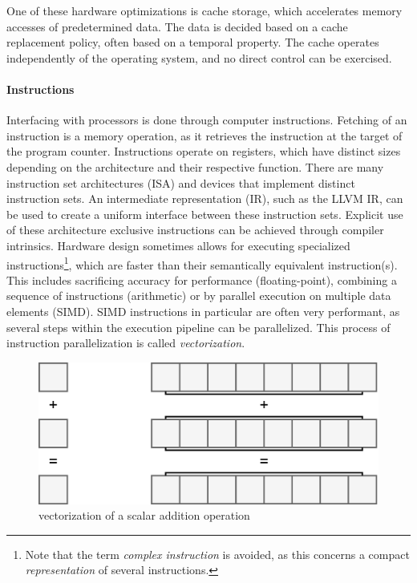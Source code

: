 \documentclass{article}
\begin{document}
One of these hardware optimizations is cache storage, which accelerates memory accesses of predetermined data.
The data is decided based on a cache replacement policy, often based on a temporal property. 
The cache operates independently of the operating system\cite{memory}, and no direct control can be exercised.

\paragraph{Instructions}

Interfacing with processors is done through computer instructions.
Fetching of an instruction is a memory operation, as it retrieves the instruction at the target of the program counter.
Instructions operate on registers, which have distinct sizes depending on the architecture and their respective function.
There are many instruction set architectures (ISA) and devices that implement distinct instruction sets.
An intermediate representation (IR), such as the LLVM IR\cite{LLVM}, can be used to create a uniform interface between these instruction sets\cite{intermediate-representation}.
Explicit use of these architecture exclusive instructions can be achieved through compiler intrinsics.
Hardware design sometimes allows for executing specialized instructions\footnote{Note that the term {\it complex instruction} is avoided, as this concerns a compact {\it representation} of several instructions. }, which are faster than their semantically equivalent instruction(s).
This includes sacrificing accuracy for performance (floating-point), combining a sequence of instructions (arithmetic) or by parallel execution on multiple data elements (SIMD).
SIMD instructions in particular are often very performant, as several steps within the execution pipeline can be parallelized.
This process of instruction parallelization is called {\it vectorization}.

\begin{figure}[ht]
    \centering
    \includegraphics[scale=0.2]{vectorization}
    \caption{ vectorization of a scalar addition operation }
\end{figure}
\end{document}

